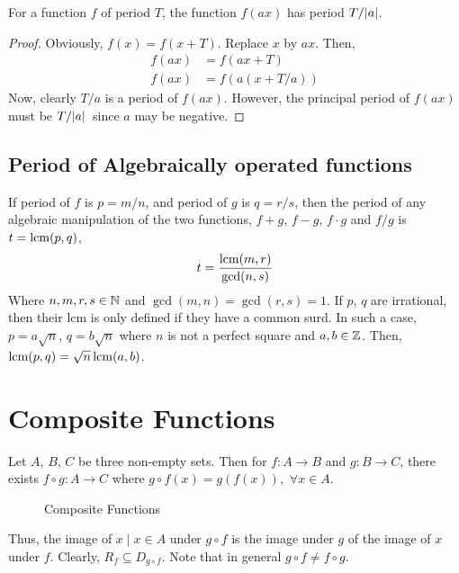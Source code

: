 \begin{claim}
    For a function \(f\) of period \(T\), the function \(f(ax)\) has period \(T/\abs{a}\).
\end{claim}

\begin{proof}
    Obviously, \(f(x) = f(x + T)\). Replace \(x\) by \(ax\). Then,
    \begin{align*}
        f(ax) &= f(ax + T) \\
        f(ax) &= f(a(x + T/a))
    \end{align*}
    Now, clearly \(T/a\) is a period of \(f(ax)\). However, the principal period of \(f(ax)\) must be 
    \(T/\abs*{a}\) since \(a\) may be negative.
\end{proof}

\subsection{Period of Algebraically operated functions}

If period of \(f\) is \(p = m/n\), and period of \(g\) is \(q = r/s\), then
the period of any algebraic manipulation of the two functions, \(f + g\), \(f - g\), 
\(f \cdot g\) and \(f/g\) is \(t = \operatorname*{lcm}(p,q)\),
\[
    t = \frac{\operatorname*{lcm}(m, r)}{\gcd(n, s)}\]
Where \(n, m, r, s \in \mathbb N\) and \(\gcd(m,n) = \gcd(r,s) = 1\). 
If \(p\), \(q\) are irrational, then their lcm is only defined if they have a common surd.
In such a case, \(p = a\sqrt{n}\), \(q = b\sqrt{n}\) where \(n\) is not a perfect square and
\(a, b \in \mathbb Z\). Then, \(\operatorname*{lcm}(p,q) = \sqrt{n} \operatorname*{lcm}(a,b)\). 

\section{Composite Functions}   

Let \(A\), \(B\), \(C\) be three non-empty sets. Then for \(f : A \to B\) and \(g : B \to C\), 
there exists \(f \circ g : A \to C\) where \(g \circ f (x) = g(f(x)),\) \(\forall x \in A\). 

\begin{figure}[htbp]
    \centering
    \caption{Composite Functions}
    \label{fig: composition}
\end{figure}

Thus, the image of \(x \mid x \in A\) under \(g \circ f\) is the image under \(g\) of the image
of \(x\) under \(f\). 
Clearly, \(R_f \subseteq D_{g \circ f}\). Note that in general \(g \circ f \ne f \circ g\).

